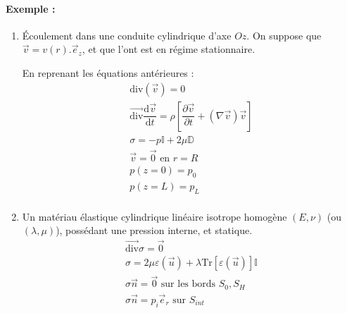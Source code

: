 \documentclass{article}
\newcommand{\deriv}{\mathrm{d}}
\begin{document}
\paragraph{Exemple :}
\begin{enumerate}
\item Écoulement dans une conduite cylindrique d'axe $Oz$. On suppose que $\vec{v}=v(r).\vec{e}_z$, et que l'ont est en régime stationnaire.

En reprenant les équations antérieures : 
\begin{align*}
\text{div}(\vec{v}) = 0\\
\overrightarrow{\text{div}}\dfrac{\deriv \vec{v}}{\deriv t}=\rho [\dfrac{\partial \vec{v}}{\partial t} + (\nabla \vec{v})\vec{v}]\\
\sigma = -p \mathbb{I} + 2\mu \mathbb{D}\\
\vec{v}=\vec{0} \text{ en } r=R\\
p(z=0)=p_0\\
p(z=L)=p_L\\
\end{align*}

\item Un matériau élastique cylindrique linéaire isotrope homogène $(E,\nu)$ (ou $(\lambda, \mu)$), possédant une pression interne, et statique.
\begin{align*}
\overrightarrow{\text{div}}\sigma = \vec{0}\\
\sigma = 2\mu \varepsilon(\vec{u}) + \lambda \text{Tr}[\varepsilon(\vec{u})] \mathbb{I}\\
\sigma \vec{n}=\vec{0} \text{ sur les bords } S_0,S_H\\
\sigma \vec{n}=p_i\vec{e}_r \text{ sur } S_{int}\\
\end{align*}



\end{enumerate}
\end{document}
